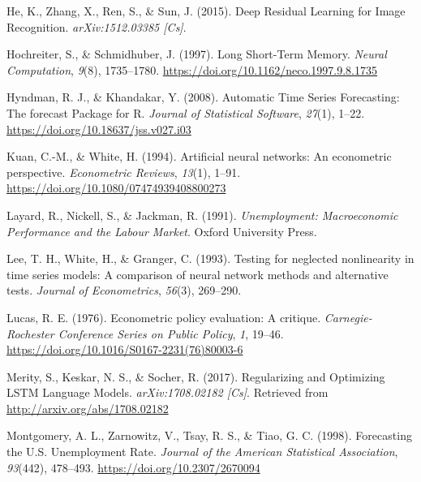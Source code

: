 \documentclass[oneside]{book}
\begin{document}
\leavevmode\hypertarget{ref-heDeepResidualLearning2015}{}%
He, K., Zhang, X., Ren, S., \& Sun, J. (2015). Deep Residual Learning for Image Recognition. \emph{arXiv:1512.03385 {[}Cs{]}}.

\leavevmode\hypertarget{ref-hochreiterLongShortTermMemory1997}{}%
Hochreiter, S., \& Schmidhuber, J. (1997). Long Short-Term Memory. \emph{Neural Computation}, \emph{9}(8), 1735--1780. \url{https://doi.org/10.1162/neco.1997.9.8.1735}

\leavevmode\hypertarget{ref-hyndmanAutomaticTimeSeries2008}{}%
Hyndman, R. J., \& Khandakar, Y. (2008). Automatic Time Series Forecasting: The forecast Package for R. \emph{Journal of Statistical Software}, \emph{27}(1), 1--22. \url{https://doi.org/10.18637/jss.v027.i03}

\leavevmode\hypertarget{ref-kuanArtificialNeuralNetworks1994}{}%
Kuan, C.-M., \& White, H. (1994). Artificial neural networks: An econometric perspective. \emph{Econometric Reviews}, \emph{13}(1), 1--91. \url{https://doi.org/10.1080/07474939408800273}

\leavevmode\hypertarget{ref-layardUnemploymentMacroeconomicPerformance1991}{}%
Layard, R., Nickell, S., \& Jackman, R. (1991). \emph{Unemployment: Macroeconomic Performance and the Labour Market}. Oxford University Press.

\leavevmode\hypertarget{ref-leeTestingNeglectedNonlinearity1993}{}%
Lee, T. H., White, H., \& Granger, C. (1993). Testing for neglected nonlinearity in time series models: A comparison of neural network methods and alternative tests. \emph{Journal of Econometrics}, \emph{56}(3), 269--290.

\leavevmode\hypertarget{ref-lucasEconometricPolicyEvaluation1976}{}%
Lucas, R. E. (1976). Econometric policy evaluation: A critique. \emph{Carnegie-Rochester Conference Series on Public Policy}, \emph{1}, 19--46. \url{https://doi.org/10.1016/S0167-2231(76)80003-6}

\leavevmode\hypertarget{ref-merityRegularizingOptimizingLSTM2017}{}%
Merity, S., Keskar, N. S., \& Socher, R. (2017). Regularizing and Optimizing LSTM Language Models. \emph{arXiv:1708.02182 {[}Cs{]}}. Retrieved from \url{http://arxiv.org/abs/1708.02182}

\leavevmode\hypertarget{ref-montgomeryForecastingUnemploymentRate1998}{}%
Montgomery, A. L., Zarnowitz, V., Tsay, R. S., \& Tiao, G. C. (1998). Forecasting the U.S. Unemployment Rate. \emph{Journal of the American Statistical Association}, \emph{93}(442), 478--493. \url{https://doi.org/10.2307/2670094}
\end{document}
